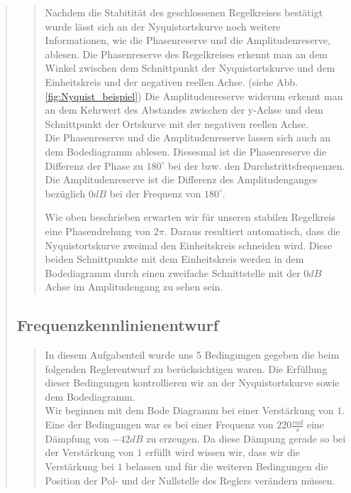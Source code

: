 \begin{quote}
\begin{quote}
        
        Nachdem die Stabitität des geschlossenen Regelkreises bestätigt wurde lässt sich an der Nyquistortskurve noch weitere
        Informationen, wie die Phasenreserve und die Amplitudenreserve, ablesen. Die Phasenreserve des Regelkreises erkennt
        man an dem Winkel zwischen dem Schnittpunkt der Nyquistortskurve und dem Einheitskreis und der negativen reellen
        Achse. (siehe Abb. \ref{fig:Nyquist_beispiel}) Die Amplitudenreserve widerum erkennt man an dem Kehrwert des Abstandes
        zwischen der y-Achse und dem Schnittpunkt der Ortskurve mit der negativen reellen Achse.\\
        Die Phasenreserve und die Amplitudenreserve lassen sich auch an dem Bodediagramm ablesen. Diesesmal ist die
        Phasenreserve die Differenz der Phase zu $180^{\circ}$ bei der bzw. den Durchstrittsfrequenzen. Die Amplitudenreserve
        ist die Differenz des Amplitudenganges bezüglich $0dB$ bei der Frequenz von $180^{\circ}$.\vspace{1em}
        
        Wie oben beschrieben erwarten wir für unseren stabilen Regelkreis eine Phasendrehung von $2\pi$. Daraus resultiert
        automatisch, dass die Nyquistortskurve zweimal den Einheitskreis schneiden wird. Diese beiden Schnittpunkte mit dem
        Einheitskreis werden in dem Bodediagramm durch einen zweifache Schnittstelle mit der $0dB$ Achse im Amplitudengang zu
        sehen sein.
        
        
    \end{quote} %
    
    \subsection{Frequenzkennlinienentwurf}
    \begin{quote}
        In diesem Aufgabenteil wurde uns 5 Bedingungen gegeben die beim folgenden Reglerentwurf zu berücksichtigen
        waren. Die Erfüllung dieser Bedingungen kontrollieren wir an der Nyquistortskurve sowie dem Bodediagramm.\\
        Wir beginnen mit dem Bode Diagramm bei einer Verstärkung von $1$. Eine der Bedingungen war es bei einer Frequenz
        von $220 \frac{rad}{s}$ eine Dämpfung von $-42 dB$ zu erzeugen. Da diese Dämpung gerade so bei der Verstärkung
        von $1$ erfüllt wird wissen wir, dass wir die Verstärkung bei $1$ belassen und für die weiteren Bedingungen die
        Position der Pol- und der Nullstelle des Reglers verändern müssen.\vspace{1em}
        

\end{quote}
\end{quote}
